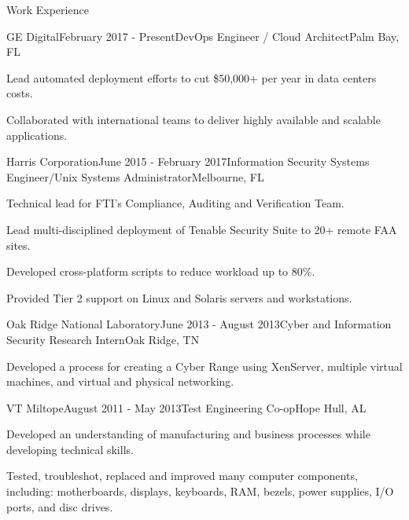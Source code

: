 \documentclass{resume} %
\begin{document}

\begin{rSection}{Work Experience}


\begin{rSubsection}{GE Digital}{February 2017 - Present}{DevOps Engineer / Cloud Architect}{Palm Bay, FL}
\item Lead automated deployment efforts to cut \$50,000+ per year in data centers costs.
\item Collaborated with international teams to deliver highly available and scalable applications.
\end{rSubsection}



\begin{rSubsection}{Harris Corporation}{June 2015 - February 2017}{Information Security Systems Engineer/Unix Systems Administrator}{Melbourne, FL}
\item Technical lead for FTI's Compliance, Auditing and Verification Team.
\item Lead multi-disciplined deployment of Tenable Security Suite to 20+ remote FAA sites.
\item Developed cross-platform scripts to reduce workload up to 80\%.
\item Provided Tier 2 support on Linux and Solaris servers and workstations.
\end{rSubsection}


\begin{rSubsection}{Oak Ridge National Laboratory}{June 2013 - August 2013}{Cyber and Information Security Research Intern}{Oak Ridge, TN}
\item Developed a process for creating a Cyber Range using XenServer, multiple virtual machines, and virtual and physical networking.
\end{rSubsection}


\begin{rSubsection}{VT Miltope}{August 2011 - May 2013}{Test Engineering Co-op}{Hope Hull, AL}
\item Developed an understanding of manufacturing and business processes while developing technical skills.
\item Tested, troubleshot, replaced and improved many computer components, including: motherboards, displays, keyboards, RAM, bezels, power supplies, I/O ports, and disc drives.
\end{rSubsection}

\end{rSection}
\end{document}
